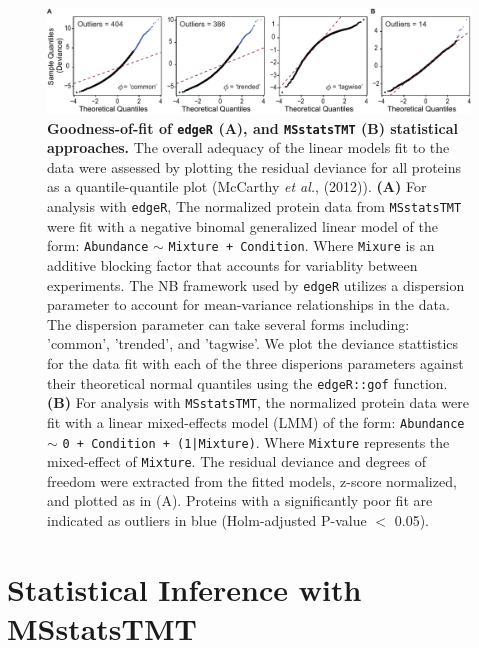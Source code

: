 \documentclass[12pt]{elife}\usepackage[]{graphicx}\usepackage[]{color}
\begin{document}
\begin{figure}[ht!] %
	\begin{fullwidth}
		\begin{center}
		\includegraphics[width=0.9\paperwidth,keepaspectratio]{gof}
		\caption{\textbf{Goodness-of-fit of \texttt{edgeR} (A), and 
		\texttt{MSstatsTMT} (B) statistical approaches.} The overall
		adequacy of the linear models fit to the data were assessed 
		by plotting the residual deviance for all proteins as a 
		quantile-quantile plot (McCarthy \textit{et al.}, (2012)). 
		\textbf{(A)} For analysis with \texttt{edgeR}, The normalized
		protein data from \texttt{MSstatsTMT} were fit with a negative
		binomal generalized linear model of the form: 
		\texttt{Abundance} $\sim$ \texttt{Mixture + Condition}.
		Where \texttt{Mixure} is an additive blocking factor that 
		accounts for variablity between experiments. 
		The NB framework used by \texttt{edgeR} utilizes a dispersion 
			parameter 
		to account for mean-variance relationships in the data.
		The dispersion parameter can take several forms including:
                'common', 'trended', and 'tagwise'. We plot the deviance
		stattistics for the data fit with each of
		the three disperions parameters against their 
		theoretical normal quantiles using the \texttt{edgeR::gof}
		function. \textbf{(B)} For analysis with \texttt{MSstatsTMT},
		the normalized protein data were fit with a linear mixed-effects 
		model (LMM) of the form: 
		\texttt{Abundance} $\sim$ \texttt{0 + Condition + (1|Mixture)}. 
		Where \texttt{Mixture} represents the mixed-effect
		of \texttt{Mixture}. The residual deviance and degrees of 
		freedom were extracted from the fitted models, z-score
		normalized, and plotted as in (A). Proteins with a significantly 
		poor fit are indicated as outliers in blue 
		(Holm-adjusted P-value $<$ 0.05).}
		\label{fig:gof}
	\end{center}
	\end{fullwidth}
\end{figure}


\section{Statistical Inference with MSstatsTMT}
\end{document}

